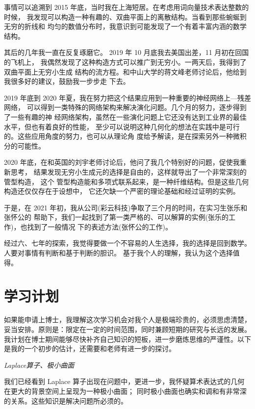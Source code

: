 \documentclass[a4paper,12pt]{article}
\numberwithin{problem}{section}
\numberwithin{definition}{section}
\numberwithin{lemma}{section}
\numberwithin{proposition}{section}
\numberwithin{theorem}{section}
\numberwithin{grammar}{section}
\numberwithin{program}{section}
\numberwithin{convention}{section}
\numberwithin{corollary}{section}
\begin{document}
\begin{displayquote}
    事情可以追溯到 2015 年底，当时我在上海短居。在考虑用词向量技术表达整数的时候，
    我发现可以构造一种有趣的、双曲平面上的离散结构。当看到那些蜿蜒到无穷的折线和
    均匀的数值分布时，我意识到可能发现了一个有着丰富内涵的数学结构。

    其后的几年我一直在反复琢磨它。 2019 年 10 月底我去美国出差，11 月初在回国的飞机上，
    我偶然发现了这种构造方式可以推广到无穷小。一两天后，我得到了双曲平面上无穷小生成
    结构的流方程。和中山大学的蒋文峰老师讨论后，他给到我很多好的建议，鼓励我一步步走
    下去。

    2019 年底到 2020 年夏，我在努力把这个结果应用到一种重要的神经网络上—残差网络，
    可以得到一类特殊的网络架构来解决演化问题。几个月的努力，逐步得到了一些有趣的神
    经网络架构，虽然在一些演化问题上它还没有达到工业界的最佳水平，但也有着良好的性能，
    至少可以说明这种几何化的想法在实践中是可行的。这些应用角度的努力，也可以从理论角
    度给予解读，是在探索另外一种微积分的可能性。

    2020 年底，在和英国的刘宇老师讨论后，他问了我几个特别好的问题，促使我重新思考，
    结果发现无穷小生成元的选择是自由的，这样就导出了一个非常深刻的管型构造， 这个
    管型构造能和多项式联系起来，是一种纤维结构。但是这些几何构造还仅仅存在于设想中，
    它还欠缺一个严密的理论基础和经过证明的实例。

    于是，在 2021 年初，我从公司(彩云科技)争取了三个月的时间，在实习生张乐和张怀公的
    帮助下，我们一起找到了第一类严格的、可以解算的实例(张乐的工作)，也找到了一般情况
    下的表述方法(张怀公的工作)。
\end{displayquote}

经过六、七年的探索，我觉得要做一个不容易的人生选择，我的选择是回到数学。人要对事情有判断和基于判断的胆识。
基于我个人的理解，我认为这个选择值得。

\newpage
\section{学习计划}

如果能申请上博士，我理解这次学习机会对我个人是极端珍贵的，必须思虑清楚，妥当安排。原则是：限定在一定的时间范围，同时兼顾短期的研究与长远的发展。
我计划在博士期间能够尽快补齐自己知识的短板，进一步磨炼思维的严谨性。以下是我的一个初步的估计，还需要和老师有进一步的探讨。

\emph{Laplace算子、极小曲面}

我们已经看到 Laplace 算子出现在问题中，更进一步，我怀疑算术表达式的几何在更大的背景空间上呈现为一种极小曲面；
同时极小曲面也确实和调和有非常深的关系。这些知识是解决问题所必须的。
\end{document}
